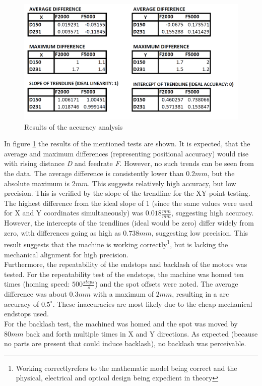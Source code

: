 \documentclass[a4paper, 11pt]{scrartcl}
\begin{document}
\begin{figure}[H]
\begin{center}
\includegraphics[width=15cm]{img/accuracy.png}
\caption{Results of the accuracy analysis}
\label{results}
\end{center}
\end{figure}
In figure \ref{results} the results of the mentioned tests are shown. It is expected, that the average and maximum differences (representing positional accuracy) would rise with rising distance \textit{D} and feedrate \textit{F}. However, no such trends can be seen from the data. The average difference is consistently lower than $0.2mm$, but the absolute maximum is $2mm$. This suggests relatively high accuracy, but low precision. This is verified by the slope of the trendline for the XY-point testing. The highest difference from the ideal slope of 1 (since the same values were used for X and Y coordinates simultaneously) was $0.018\frac{mm}{mm}$, suggesting high accuracy. However, the intercepts of the trendlines (ideal would be zero) differ widely from zero, with differences going as high as $0.738mm$, suggesting low precision. This result suggests that the machine is working correctly\footnote{\glqq Working correctly\grqq refers to the mathematic model being correct and the physical, electrical and optical design being expedient in theory}, but is lacking the mechanical alignment for high precision.\\ 
Furthermore, the repeatability of the endstops and backlash of the motors was tested. For the repeatability test of the endstops, the machine was homed ten times (homing speed: $500\frac{steps}{s}$) and the spot offsets were noted. The average difference was about $0.3mm$ with a maximum of $2mm$, resulting in a arc accuracy of $0.5^\circ$. These inaccuracies are most likely due to the cheap mechanical endstops used.\\
For the backlash test, the machined was homed and the spot was moved by $80mm$ back and forth multiple times in X and Y directions. As expected (because no parts are present that could induce backlash), no backlash was perceivable.
\end{document}
